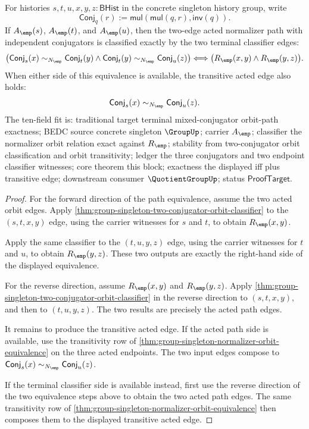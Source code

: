 \begin{theorem}
\label{thm:group-singleton-two-conjugator-orbit-path-classifier}
For histories $s,t,u,x,y,z:\mathsf{BHist}$ in the concrete singleton history
group, write
$$
\mathsf{Conj}_q(r):=\mathsf{mul}(\mathsf{mul}(q,r),\mathsf{inv}(q)).
$$
If $A_{\emp}(s)$, $A_{\emp}(t)$, and $A_{\emp}(u)$, then the two-edge acted
normalizer path with independent conjugators is classified exactly by the two
terminal classifier edges:
$$
\bigl(\mathsf{Conj}_s(x)\sim_{N_{\emp}}\mathsf{Conj}_t(y)
\land
\mathsf{Conj}_t(y)\sim_{N_{\emp}}\mathsf{Conj}_u(z)\bigr)
\Longleftrightarrow
\bigl(R_{\emp}(x,y)\land R_{\emp}(y,z)\bigr).
$$
When either side of this equivalence is available, the transitive acted edge
also holds:
$$
\mathsf{Conj}_s(x)\sim_{N_{\emp}}\mathsf{Conj}_u(z).
$$
The ten-field fit is: traditional target terminal mixed-conjugator orbit-path
exactness; BEDC source concrete singleton $\GroupUp$; carrier $A_{\emp}$;
classifier the normalizer orbit relation exact against $R_{\emp}$; stability
from two-conjugator orbit classification and orbit transitivity; ledger the
three conjugators and two endpoint classifier witnesses; core theorem this
block; exactness the displayed iff plus transitive edge; downstream consumer
$\QuotientGroupUp$; status $\mathsf{ProofTarget}$.
\end{theorem}
\begin{proof}
For the forward direction of the path equivalence, assume the two acted orbit
edges. Apply
\autoref{thm:group-singleton-two-conjugator-orbit-classifier} to the
$(s,t,x,y)$ edge, using the carrier witnesses for $s$ and $t$, to obtain
$R_{\emp}(x,y)$.

Apply the same classifier to the $(t,u,y,z)$ edge, using the carrier witnesses
for $t$ and $u$, to obtain $R_{\emp}(y,z)$. These two outputs are exactly the
right-hand side of the displayed equivalence.

For the reverse direction, assume $R_{\emp}(x,y)$ and $R_{\emp}(y,z)$. Apply
\autoref{thm:group-singleton-two-conjugator-orbit-classifier} in the reverse
direction to $(s,t,x,y)$, and then to $(t,u,y,z)$. The two results are precisely
the acted path edges.

It remains to produce the transitive acted edge. If the acted path side is
available, use the transitivity row of
\autoref{thm:group-singleton-normalizer-orbit-equivalence} on the three acted
endpoints. The two input edges compose to
$\mathsf{Conj}_s(x)\sim_{N_{\emp}}\mathsf{Conj}_u(z)$.

If the terminal classifier side is available instead, first use the reverse
direction of the two equivalence steps above to obtain the two acted path edges.
The same transitivity row of
\autoref{thm:group-singleton-normalizer-orbit-equivalence} then composes them to
the displayed transitive acted edge.
\end{proof}

